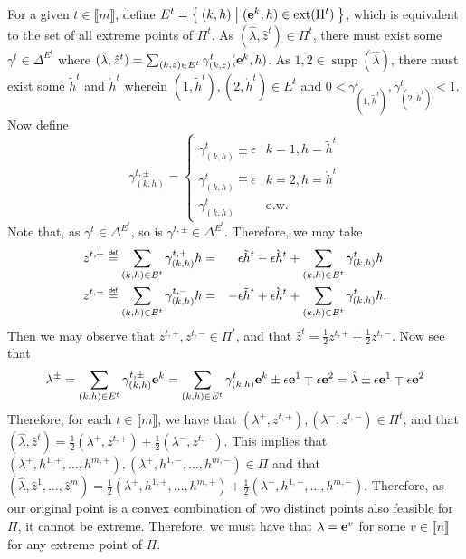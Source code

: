 \documentclass[opre,nonblindrev]{informs3} %
\newcommand{\ext}{\operatorname{ext}}
\newcommand{\supp}{\operatorname{supp}}
\newcommand\defeq{\mathrel{\overset{\makebox[0pt]{\mbox{\normalfont\tiny\sffamily def}}}{=}}}
\begin{document}
\begin{APPENDICES}
        For a given $t \in \llbracket m \rrbracket$, define $E^t = \Set{(k,h) | ({\bf e}^k,h) \in \ext(\Pi^t) }$, which is equivalent to the set of all extreme points of $\Pi^t$.
        As $(\hat{\lambda},\hat{z}^t) \in \Pi^t$, there must exist some $\gamma^t \in \Delta^{E^t}$ where $(\hat{\lambda},\hat{z}^t) = \sum_{(k,z) \in E^t} \gamma^t_{(k,z)} ({\bf e}^k,h)$. As $1,2 \in \supp(\hat{\lambda})$, there must exist some $\tilde{h}^t$ and $\grave{h}^t$ wherein $(1,\tilde{h}^t), (2,\grave{h}^t) \in E^t$ and $0 < \gamma^t_{(1,\tilde{h}^t)}, \gamma^t_{(2,\grave{h}^t)} < 1$.
        Now define
        \[
            \gamma^{t,\pm}_{(k,h)} = \begin{cases} \gamma^t_{(k,h)} \pm \epsilon & k = 1, h = \tilde{h}^t \\ \gamma^t_{(k,h)} \mp \epsilon & k = 2, h = \grave{h}^t \\ \gamma^t_{(k,h)} & \text{o.w.} \end{cases}
        \]
        Note that, as $\gamma^t \in \Delta^{E^t}$, so is $\gamma^{t,\pm} \in \Delta^{E^t}$. Therefore, we may take
        \begin{alignat*}{3}
            z^{t,+} &\defeq \sum_{(k,h) \in E^t} \gamma^{t,+}_{(k,h)} h =&  &\epsilon \tilde{h}^t - \epsilon \grave{h}^t + \sum_{(k,h) \in E^t} \gamma^t_{(k,h)} h \\
            z^{t,-} &\defeq \sum_{(k,h) \in E^t} \gamma^{t,-}_{(k,h)} h =& -&\epsilon \tilde{h}^t + \epsilon \grave{h}^t + \sum_{(k,h) \in E^t} \gamma^t_{(k,h)} h.
        \end{alignat*}
        Then we may observe that $z^{t,+},z^{t,-} \in \Pi^t$, and that $\hat{z}^t = \frac{1}{2} z^{t,+} + \frac{1}{2} z^{t,-}$. Now see that
        \[
            \lambda^\pm = \sum_{(k,h) \in E^t} \gamma^{t,\pm}_{(k,h)} {\bf e}^k = \sum_{(k,h) \in E^t} \gamma^t_{(k,h)} {\bf e}^k \pm \epsilon {\bf e}^1 \mp \epsilon {\bf e}^2 = \hat{\lambda} \pm \epsilon {\bf e}^1 \mp \epsilon {\bf e}^2
        \]
        Therefore, for each $t \in \llbracket m \rrbracket$, we have that $(\lambda^+,z^{t,+}),(\lambda^-,z^{t,-}) \in \Pi^t$, and that $(\hat{\lambda},\hat{z}^t) = \frac{1}{2}(\lambda^+,z^{t,+}) + \frac{1}{2}(\lambda^-,z^{t,-})$. This implies that $(\lambda^+,h^{1,+},\ldots,h^{m,+}),(\lambda^+,h^{1,-},\ldots,h^{m,-}) \in \Pi$ and that $(\hat{\lambda},\hat{z}^1,\ldots,\hat{z}^m) = \frac{1}{2}(\lambda^+,h^{1,+},\ldots,h^{m,+}) + \frac{1}{2}(\lambda^-,h^{1,-},\ldots,h^{m,-})$.
        Therefore, as our original point is a convex combination of two distinct points also feasible for $\Pi$, it cannot be extreme. Therefore, we must have that $\lambda = {\bf e}^v$ for some $v \in \llbracket n \rrbracket$ for any extreme point of $\Pi$.


\end{APPENDICES}
\end{document}
